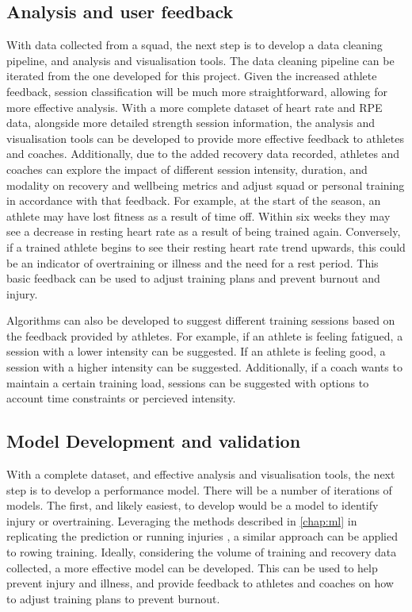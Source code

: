 \subsection{Analysis and user feedback}
With data collected from a squad, the next step is to develop a data cleaning pipeline, and analysis and visualisation tools. The data cleaning pipeline can be iterated from the one developed for this project. Given the increased athlete feedback, session classification will be much more straightforward, allowing for more effective analysis. With a more complete dataset of heart rate and RPE data, alongside more detailed strength session information, the analysis and visualisation tools can be developed to provide more effective feedback to athletes and coaches. Additionally, due to the added recovery data recorded, athletes and coaches can explore the impact of different session intensity, duration, and modality on recovery and wellbeing metrics and adjust squad or personal training in accordance with that feedback. For example, at the start of the season, an athlete may have lost fitness as a result of time off. Within six weeks they may see a decrease in resting heart rate as a result of being trained again. Conversely, if a trained athlete begins to see their resting heart rate trend upwards, this could be an indicator of overtraining or illness and the need for a rest period. This basic feedback can be used to adjust training plans and prevent burnout and injury.

Algorithms can also be developed to suggest different training sessions based on the feedback provided by athletes. For example, if an athlete is feeling fatigued, a session with a lower intensity can be suggested. If an athlete is feeling good, a session with a higher intensity can be suggested. Additionally, if a coach wants to maintain a certain training load, sessions can be suggested with options to account time constraints or percieved intensity.

\subsection{Model Development and validation}
With a complete dataset, and effective analysis and visualisation tools, the next step is to develop a performance model. There will be a number of iterations of models. The first, and likely easiest, to develop would be a model to identify injury or overtraining. Leveraging the methods described in \autoref{chap:ml} in replicating the prediction or running injuries \cite{Lovdal2021}, a similar approach can be applied to rowing training. Ideally, considering the volume of training and recovery data collected, a more effective model can be developed. This can be used to help prevent injury and illness, and provide feedback to athletes and coaches on how to adjust training plans to prevent burnout.


